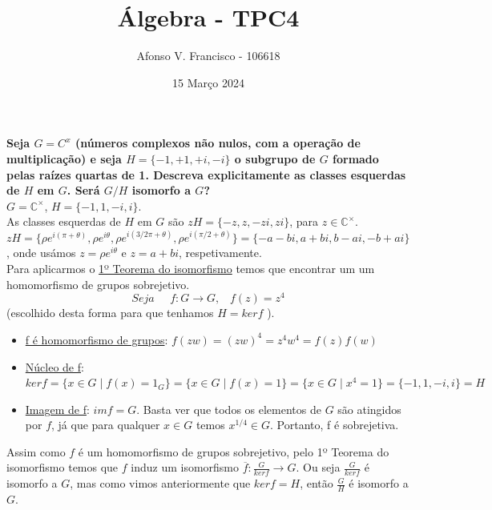 \documentclass{article}
\title{Álgebra - TPC4}
\author{Afonso V. Francisco - 106618 }
\date{15 Março 2024}
\begin{document}
\maketitle

\textbf{Seja $G=C^x$ (números complexos não nulos, com a operação de multiplicação) e seja  $H = \{-1,+1,+i,-i\}$ o subgrupo de $G$ formado pelas raízes quartas de 1. Descreva explicitamente as classes esquerdas de $H$ em $G$. Será $G/H$ isomorfo a $G$?}\\

$G=\mathbb{C}^{\times}$, $H=\{-1,1,-i,i\}$.\\
As classes esquerdas de $H$ em $G$ são $zH=\{-z,z,-zi,zi\}$, para $z \in \mathbb{C}^{\times}$. $zH=\{\rho e^{i({\pi + \theta})},\rho e^{i \theta},\rho e^{i({3/2\pi + \theta})},\rho e^{i({\pi/2 + \theta})}\}=\{-a-bi,a+bi,b-ai,-b+ai\}$, onde usámos $z=\rho e^{i \theta }$ e $z=a+bi$, respetivamente.\\


Para aplicarmos o \underline{1º Teorema do isomorfismo} temos que encontrar um um homomorfismo de grupos sobrejetivo.
$$Seja \;\;\;\;\; f:G \rightarrow G,\;\;\; f(z)=z^4$$ (escolhido desta forma para que tenhamos $H=ker f$ ).

\begin{itemize}
    \item \underline{f é homomorfismo de grupos}:
    $f(zw)=(zw)^4=z^4w^4=f(z)f(w)$
    \item \underline{Núcleo de f}:
    $ker f=\{x \in G \mid f(x)=1_G\}=\{x \in G \mid f(x)=1\}=\{x \in G \mid x^4=1\}=\{-1,1,-i,i\}=H$
    \item \underline{Imagem de f}:
    $im f = G$. Basta ver que todos os elementos de $G$ são atingidos por $f$, já que para qualquer $x \in G$ temos $x^{1/4} \in G$.
    Portanto, f é sobrejetiva.
\end{itemize}

Assim como $f$ é um homomorfismo de grupos sobrejetivo, pelo 1º Teorema do isomorfismo temos que $f$ induz um isomorfismo $\overline{f}:\frac{G}{ker f} \rightarrow G$. Ou seja $\frac{G}{ker f}$ é isomorfo a $G$, mas como vimos anteriormente que $ker f=H$, então $\frac{G}{H}$ é isomorfo a $G$.
\end{document}
